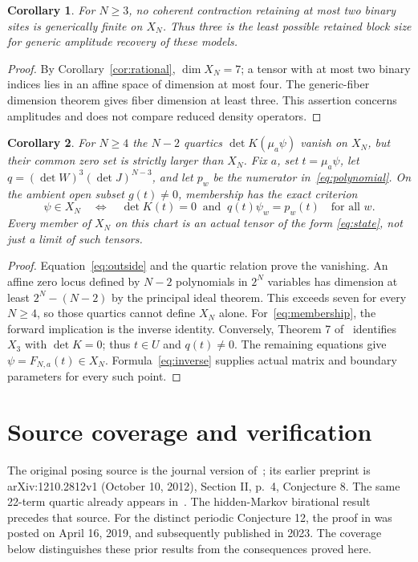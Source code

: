 \documentclass[11pt]{article}
\newtheorem{corollary}{Corollary}
\begin{document}
\begin{corollary}\label{cor:minimal}
For $N\geq3$, no coherent contraction retaining at most two binary sites
is generically finite on $X_N$. Thus three is the least possible retained
block size for generic amplitude recovery of these models.
\end{corollary}
\begin{proof}
By Corollary~\ref{cor:rational}, $\dim X_N=7$; a tensor with at most two
binary indices lies in an affine space of dimension at most four.
The generic-fiber dimension theorem gives fiber dimension at least three.
This assertion concerns amplitudes and does not compare reduced density operators.
\end{proof}

\begin{corollary}\label{cor:equations}
For $N\geq4$ the $N-2$ quartics $\det K(\mu_a\psi)$ vanish on $X_N$,
but their common zero set is strictly larger than $X_N$.
Fix $a$, set $t=\mu_a\psi$, let $q=(\det W)^3(\det J)^{N-3}$,
and let $p_w$ be the numerator in~\eqref{eq:polynomial}.
On the ambient open subset $g(t)\ne0$, membership has the exact criterion
\begin{equation}\label{eq:membership}
 \psi\in X_N\quad\Longleftrightarrow\quad
 \det K(t)=0\ \text{ and }\ q(t)\psi_w=p_w(t)\quad\text{for all }w.
\end{equation}
Every member of $X_N$ on this chart is an actual tensor of the form
\eqref{eq:state}, not just a limit of such tensors.
\end{corollary}
\begin{proof}
Equation~\eqref{eq:outside} and the quartic relation prove the vanishing.
An affine zero locus defined by $N-2$ polynomials in $2^N$ variables has
dimension at least $2^N-(N-2)$ by the principal ideal theorem. This exceeds
seven for every $N\geq4$, so those quartics cannot define $X_N$ alone.
For~\eqref{eq:membership}, the forward implication is the inverse identity.
Conversely, Theorem 7 of~\cite{CM} identifies $X_3$ with $\det K=0$;
thus $t\in U$ and $q(t)\ne0$. The remaining equations give
$\psi=F_{N,a}(t)\in X_N$. Formula~\eqref{eq:inverse} supplies actual
matrix and boundary parameters for every such point.
\end{proof}

\section{Source coverage and verification}
The original posing source is the journal version of~\cite{CM}; its earlier
preprint is arXiv:1210.2812v1 (October 10, 2012), Section II, p.\ 4,
Conjecture 8. The same 22-term quartic already appears
in~\cite[Section 2, p.\ 4 of the arXiv version]{PS}.
The hidden-Markov birational result~\cite{HMM}
precedes that source. For the distinct periodic Conjecture 12, the proof in
\cite[Theorem 3.30]{CMS} was posted on April 16, 2019, and subsequently
published in 2023. The coverage below distinguishes these prior results from
the consequences proved here.
\end{document}
